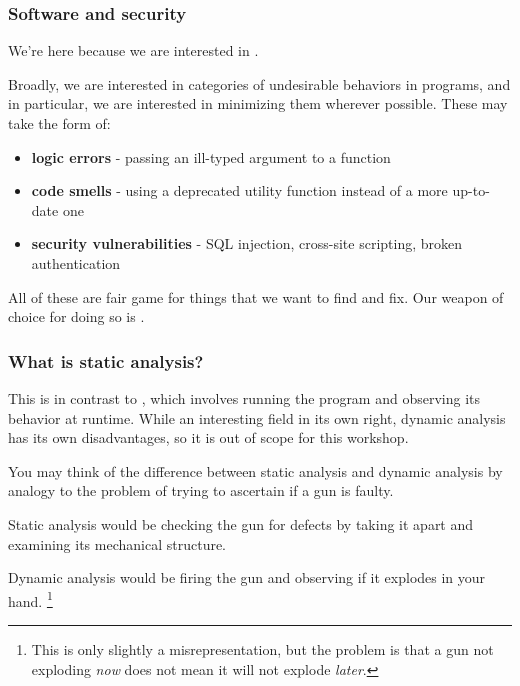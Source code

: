 \documentclass[aspectratio=169, handout]{beamer}
\begin{document}
\begin{frame}[fragile]
  \frametitle{Software and security}

  We're here because we are interested in .

  \pause
  \vspace{5pt}

  Broadly, we are interested in categories of undesirable behaviors in programs, and
  in particular, we are interested in minimizing them wherever possible. These may
  take the form of:

  \pause
  \vspace{5pt}

  \begin{itemize}
    \item \textbf{logic errors} - passing an ill-typed argument to a function
    \pause
    \item \textbf{code smells} - using a deprecated utility function instead of a more
    up-to-date one
    \pause
    \item \textbf{security vulnerabilities} - SQL injection, cross-site scripting, broken authentication
  \end{itemize}

  \pause
  \vspace{5pt}

  All of these are fair game for things that we want to find and fix. Our weapon of
  choice for doing so is .
\end{frame}

\begin{frame}[fragile]
  \frametitle{What is static analysis?}


  \pause
  \vspace{5pt}

  This is in contrast to , which involves running the program and observing
  its behavior at runtime. While an interesting field in its own right, dynamic analysis
  has its own disadvantages, so it is out of scope for this workshop.

  \pause
  \vspace{\fill}

  You may think of the difference between static analysis and dynamic analysis by analogy to
  the problem of trying to ascertain if a gun is faulty.

  \pause
  \vspace{\fill}

  Static analysis would be checking the gun for defects by taking it apart and examining its
  mechanical structure.

  \pause
  \vspace{5pt}

  Dynamic analysis would be firing the gun and observing if it explodes in your hand.
  \footnote{This is only slightly a misrepresentation, but the problem is that a gun not exploding \textit{now}
  does not mean it will not explode \textit{later}.}
\end{frame}
\end{document}
